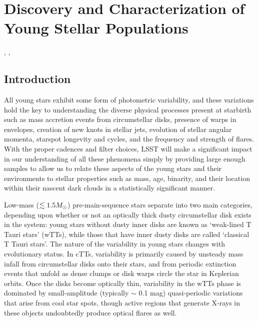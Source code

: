 %
%

\section{Discovery and Characterization of Young Stellar Populations}
\def\secname{youngstars}\label{sec:\secname}

,
,

\subsection{Introduction}

All young stars exhibit some form of
photometric variability, and these variations hold the key
to understanding the diverse physical processes present at starbirth
such as mass accretion events from circumstellar disks, presence of
warps in envelopes, creation of new knots in stellar jets,
evolution of stellar angular momenta, starspot longevity and cycles,
and the frequency and strength of flares.
With the proper cadences and filter choices,
LSST will make a significant impact in our understanding of all
these phenomena simply by providing large enough samples to allow
us to relate these aspects of the young stars and their environments
to stellar properties such as mass, age, binarity,
and their location within their nascent dark clouds in a statistically
significant manner.

Low-mass ($\lesssim 1.5 M_{\odot}$) pre-main-sequence stars separate
into two main categories, depending upon whether or not an optically thick
dusty circumstellar disk exists in the system: young stars without dusty
inner disks are known as `weak-lined T Tauri stars' (wTTs), while those
that have inner dusty disks are called `classical T Tauri stars'.
The nature of the variability in young stars changes with evolutionary status.
In cTTs, variability is primarily caused by unsteady mass infall from circumstellar disks
onto their stars, and from periodic extinction events that unfold as dense
clumps or disk warps circle the star in Keplerian orbits.
Once the disks become optically thin, variability in the wTTs phase
is dominated by small-amplitude (typically $\sim$ 0.1 mag)
quasi-periodic variations that arise
from cool star spots, though active regions that generate X-rays in
these objects undoubtedly produce optical flares as well.

